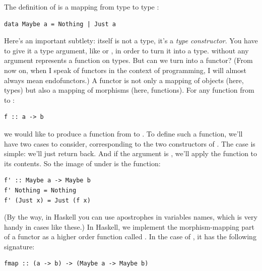 The definition of  is a mapping from type  to
type :

\begin{verbatim}
data Maybe a = Nothing | Just a
\end{verbatim}
Here's an important subtlety:  itself is not a type, it's
a \emph{type constructor}. You have to give it a type argument, like
 or , in order to turn it into a type.
 without any argument represents a function on types. But
can we turn  into a functor? (From now on, when I speak of
functors in the context of programming, I will almost always mean
endofunctors.) A functor is not only a mapping of objects (here, types)
but also a mapping of morphisms (here, functions). For any function from
 to :

\begin{verbatim}
f :: a -> b
\end{verbatim}
we would like to produce a function from  to
. To define such a function, we'll have two cases to
consider, corresponding to the two constructors of . The
 case is simple: we'll just return 
back. And if the argument is , we'll apply the function
 to its contents. So the image of  under
 is the function:

\begin{verbatim}
f' :: Maybe a -> Maybe b
f' Nothing = Nothing
f' (Just x) = Just (f x)
\end{verbatim}
(By the way, in Haskell you can use apostrophes in variables names,
which is very handy in cases like these.) In Haskell, we implement the
morphism-mapping part of a functor as a higher order function called
. In the case of , it has the following
signature:

\begin{verbatim}
fmap :: (a -> b) -> (Maybe a -> Maybe b)
\end{verbatim}

\begin{figure}[H]
\centering
{}
\end{figure}

